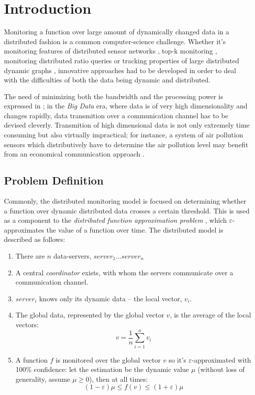 \documentclass[11pt, conference]{article}
\begin{document}
\section{Introduction}

Monitoring a function over large amount of dynamically changed data in a distributed fashion is a common computer-science challenge. Whether it's monitoring features of distributed sensor networks \cite{burdakis2012detecting}, top-k monitoring \cite{babcock2003distributed}, monitoring distributed ratio queries \cite{gupta2013ratio} or tracking properties of large distributed dynamic graphs \cite{mcgregor2015densest}, innovative approaches had to be developed in order to deal with the difficulties of both the data being dynamic and distributed.

The need of minimizing both the bandwidth and the processing power is expressed in \cite{giatrakos2013network}; in the \textit{Big Data} era, where data is of very high dimensionality and changes rapidly, data transmition over a communication channel has to be devised cleverly. Transmition of high dimensional data is not only extremely time consuming but also virtually impractical; for instance, a system of air pollution sensors which distributively have to determine the air pollution level may benefit from an economical communication approach \cite{cheng2004revised}.

\subsection{Problem Definition}

Commonly, the distributed monitoring model is focused on determining whether a function over dynamic distributed data crosses a certain threshold. This is used as a component to the \textit{distributed function approximation problem} \cite{garofalakis2013sketch}, which $\varepsilon$-approximates the value of a function over time. The distributed model is described as follows:
\begin{enumerate}
\item There are $n$ data-servers, $server_1 ... server_n$
\item A central \textit{coordinator} exists, with whom the servers communicate over a communication channel.
\item $server_i$ knows only its dynamic data -- the local vector, $v_i$.
\item The global data, represented by the global vector $v$, is the average of the local vectors:
\begin{equation}
v = \frac{1}{n}\sum\limits_{i=1}^n {v_i}
\end{equation}
\item A function $f$ is monitored over the global vector $v$ so it's $\varepsilon$-approximated with 100\% confidence: let the estimation be the dynamic value $\mu$ (without loss of generality, assume ${\mu \geq 0}$), then at all times: 
\begin{equation}
(1-\varepsilon )\mu \leq f(v) \leq (1+\varepsilon )\mu
\end{equation}
\end{enumerate}
\end{document}
